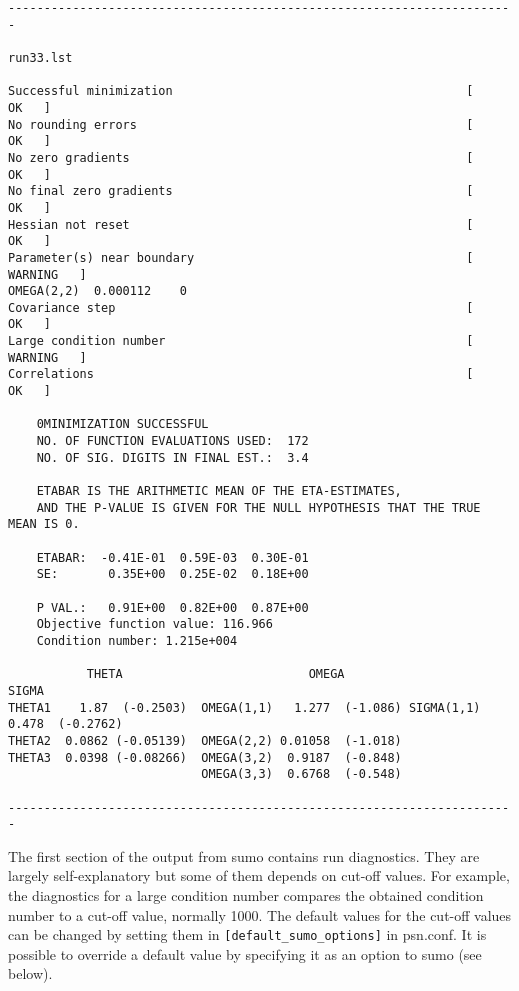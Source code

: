 \begin{verbatim}
-----------------------------------------------------------------------

run33.lst

Successful minimization                                         [    OK   ]   
No rounding errors                                              [    OK   ]   
No zero gradients                                               [    OK   ]   
No final zero gradients                                         [    OK   ]   
Hessian not reset                                               [    OK   ]   
Parameter(s) near boundary                                      [    WARNING   ]   
OMEGA(2,2)	0.000112	0
Covariance step                                                 [    OK   ]   
Large condition number                                          [    WARNING   ]   
Correlations                                                    [    OK   ]

    0MINIMIZATION SUCCESSFUL
    NO. OF FUNCTION EVALUATIONS USED:  172
    NO. OF SIG. DIGITS IN FINAL EST.:  3.4

    ETABAR IS THE ARITHMETIC MEAN OF THE ETA-ESTIMATES,
    AND THE P-VALUE IS GIVEN FOR THE NULL HYPOTHESIS THAT THE TRUE MEAN IS 0.

    ETABAR:  -0.41E-01  0.59E-03  0.30E-01
    SE:       0.35E+00  0.25E-02  0.18E+00

    P VAL.:   0.91E+00  0.82E+00  0.87E+00
    Objective function value: 116.966
    Condition number: 1.215e+004

           THETA                          OMEGA                      SIGMA            
THETA1    1.87  (-0.2503)  OMEGA(1,1)   1.277  (-1.086) SIGMA(1,1) 0.478  (-0.2762) 
THETA2  0.0862 (-0.05139)  OMEGA(2,2) 0.01058  (-1.018)                                
THETA3  0.0398 (-0.08266)  OMEGA(3,2)  0.9187  (-0.848)
                           OMEGA(3,3)  0.6768  (-0.548)

-----------------------------------------------------------------------
\end{verbatim}

The first section of the output from sumo contains run diagnostics. They are largely self-explanatory but some of them depends on cut-off values. For example, the diagnostics for a large condition number compares the obtained condition number to a cut-off value, normally 1000. The default values for the cut-off values can be changed by setting them in 
\verb|[default_sumo_options]| in psn.conf. It is possible to override a default value by specifying it as an option to sumo (see below).

